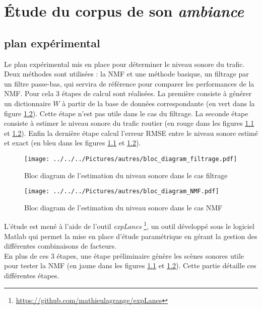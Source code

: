 
\chapter{\'Etude du corpus de son \textit{ambiance}}

\section{plan expérimental}

Le plan expérimental mis en place pour déterminer le niveau sonore du trafic. Deux méthodes sont utilisées : la NMF et une méthode basique, un filtrage par un filtre passe-bas, qui servira de référence pour comparer les performances de la NMF. Pour cela 3 étapes de calcul sont réalisées. La première consiste à générer un dictionnaire $W$ à partir de la base de données correspondante (en vert dans la figure \ref{fig:bloc_diag_nmf}). Cette étape n'est pas utile dans le cas du filtrage. La seconde étape consiste à estimer le niveau sonore du trafic routier (en rouge dans les figures \ref{fig:bloc_diag_filtre} et \ref{fig:bloc_diag_nmf}). Enfin la dernière étape calcul l'erreur RMSE entre le niveau sonore estimé et exact (en bleu dans les figures \ref{fig:bloc_diag_filtre} et \ref{fig:bloc_diag_nmf}). \\

\begin{figure}[t]
\centering
\texttt{[image: ../../../Pictures/autres/bloc\_diagram\_filtrage.pdf]}
\caption{Bloc diagram de l'estimation du niveau sonore dans le cas  \og filtrage \fg{}}
\label{fig:bloc_diag_filtre}
\end{figure}

\begin{figure}[t]
\centering
\texttt{[image: ../../../Pictures/autres/bloc\_diagram\_NMF.pdf]}
\caption{Bloc diagram de l'estimation du niveau sonore dans le cas \og NMF \fg{}}
\label{fig:bloc_diag_nmf}
\end{figure}



L'étude est mené à l'aide de l'outil \textit{expLanes} \footnote{\url{https://github.com/mathieulagrange/expLanes}}, un outil développé sous le logiciel Matlab qui permet la mise en place d'étude paramétrique en gérant la gestion des différentes combinaisons de facteurs.\\

En plus de ces 3 étapes, une étape préliminaire génère les scènes sonores utile pour tester la NMF (en jaune dans les figures \ref{fig:bloc_diag_filtre} et \ref{fig:bloc_diag_nmf}). Cette partie détaille ces différentes étapes. 

